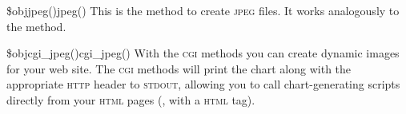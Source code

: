 \begin{MethDecl}{\$obj\deref jpeg()}{jpeg()}
This is the method to create \textsc{jpeg} files. It works analogously
to the  method.
\end{MethDecl}

\begin{MethDecl}{\$obj\deref cgi\_jpeg()}{cgi\_jpeg()}
With the \textsc{cgi} methods you can create dynamic images for your web
site. The \textsc{cgi} methods will print the chart along with the
appropriate \textsc{http} header to \textsc{stdout}, allowing you to
call chart-generating scripts directly from your \textsc{html} pages
(\eg, with a 
\textsc{html} tag).
\end{MethDecl}

